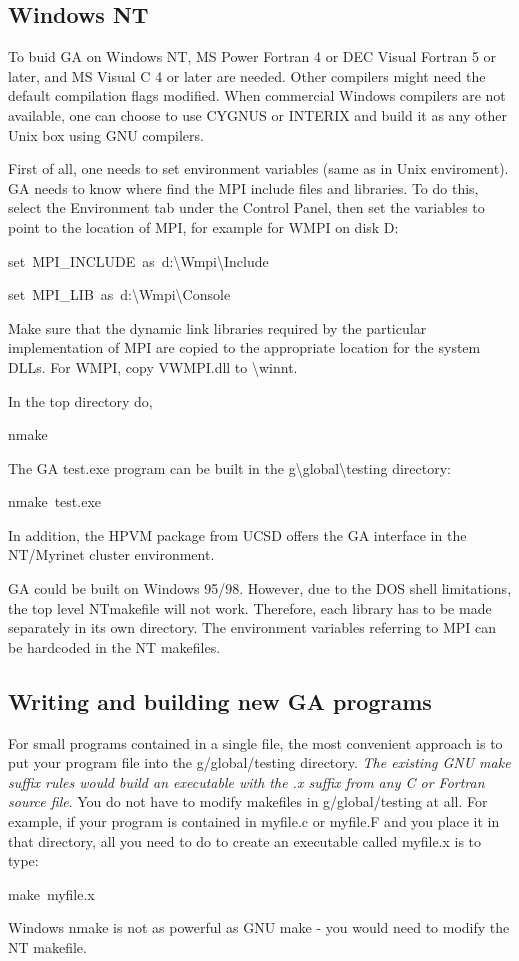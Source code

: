 \subsection{Windows NT }

To buid GA on Windows NT, MS Power Fortran 4 or DEC Visual Fortran
5 or later, and MS Visual C 4 or later are needed. Other compilers
might need the default compilation flags modified. When commercial
Windows compilers are not available, one can choose to use CYGNUS
or INTERIX and build it as any other Unix box using GNU compilers.

First of all, one needs to set environment variables (same as in Unix
enviroment). GA needs to know where find the MPI include files and
libraries. To do this, select the Environment tab under the Control
Panel, then set the variables to point to the location of MPI, for
example for WMPI on disk D:
\begin{lyxcode}
set~MPI\_INCLUDE~as~d:\textbackslash{}Wmpi\textbackslash{}Include~

set~MPI\_LIB~as~d:\textbackslash{}Wmpi\textbackslash{}Console
\end{lyxcode}
Make sure that the dynamic link libraries required by the particular
implementation of MPI are copied to the appropriate location for the
system DLLs. For WMPI, copy VWMPI.dll to \textbackslash{}winnt.

In the top directory do,
\begin{lyxcode}
nmake
\end{lyxcode}
The GA test.exe program can be built in the g\textbackslash{}global\textbackslash{}testing
directory:
\begin{lyxcode}
nmake~test.exe
\end{lyxcode}
In addition, the HPVM package from UCSD offers the GA interface in
the NT/Myrinet cluster environment.

GA could be built on Windows 95/98. However, due to the DOS shell
limitations, the top level NTmakefile will not work. Therefore, each
library has to be made separately in its own directory. The environment
variables referring to MPI can be hardcoded in the NT makefiles.


\subsection{Writing and building new GA programs}

For small programs contained in a single file, the most convenient
approach is to put your program file into the g/global/testing directory.
\emph{The existing GNU make suffix rules would build an executable
with the \textquotedbl{}.x\textquotedbl{} suffix from any C or Fortran
source file}. You do not have to modify makefiles in g/global/testing
at all. For example, if your program is contained in myfile.c or myfile.F
and you place it in that directory, all you need to do to create an
executable called myfile.x is to type: 
\begin{lyxcode}
make~myfile.x
\end{lyxcode}
Windows nmake is not as powerful as GNU make - you would need to modify
the NT makefile.


